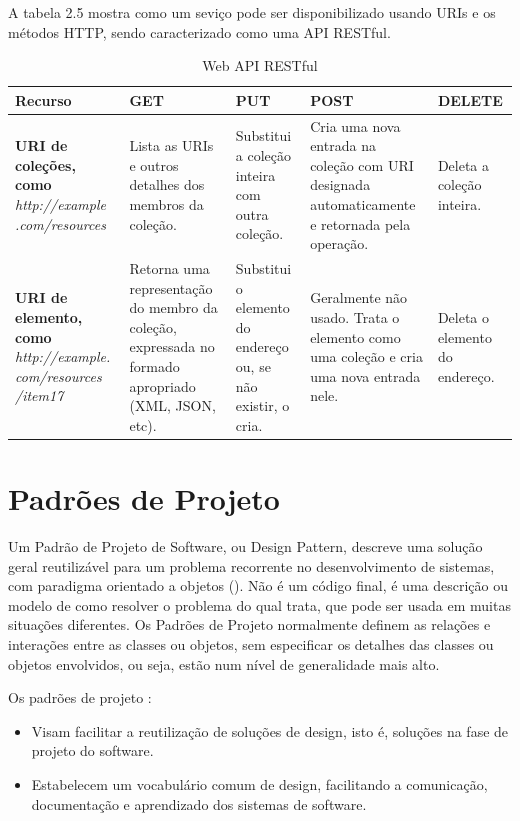 A tabela 2.5 mostra como um seviço pode ser disponibilizado usando URIs e os métodos HTTP, sendo caracterizado como uma API RESTful.

\begin{table}[!h]
\caption{Web API RESTful}
  \centering
	\begin{tabularx}{\textwidth}{|X|X|X|X|X|}
		\hline
			\textbf{Recurso} & \textbf{GET} & \textbf{PUT} & \textbf{POST} & \textbf{DELETE}
		\\
		\hline
			\textbf{URI de coleções, como} \textit{http://example .com/resources}
			& Lista as URIs e outros detalhes dos membros da coleção.
			& Substitui a coleção inteira com outra coleção.
		  & Cria uma nova entrada na coleção com URI designada automaticamente e retornada pela operação.
			& Deleta a coleção inteira.
		\\
		\hline
			\textbf{URI de elemento, como} \textit{http://example. com/resources /item17}
			& Retorna uma representação do membro da coleção, expressada no formado apropriado (XML, JSON, etc).
			& Substitui o elemento do endereço ou, se não existir, o cria.
		  & Geralmente não usado. Trata o elemento como uma coleção e cria uma nova entrada nele.
			& Deleta o elemento do endereço.
		\\
\hline
\end{tabularx}
\end{table}

\section {Padrões de Projeto}

Um Padrão de Projeto de Software, ou Design Pattern, descreve uma solução geral reutilizável para um problema recorrente no desenvolvimento de sistemas, com paradigma orientado a objetos (\textcite{Gamma:2000}). Não é um código final, é uma descrição ou modelo de como resolver o problema do qual trata, que pode ser usada em muitas situações diferentes. Os Padrões de Projeto normalmente definem as relações e interações entre as classes ou objetos, sem especificar os detalhes das classes ou objetos envolvidos, ou seja, estão num nível de generalidade mais alto.

Os padrões de projeto :

\begin{itemize}
	\item Visam facilitar a reutilização de soluções de design, isto é, soluções na fase de projeto do software.
	\item Estabelecem um vocabulário comum de design, facilitando a comunicação, documentação e aprendizado dos sistemas de software.
\end{itemize}

